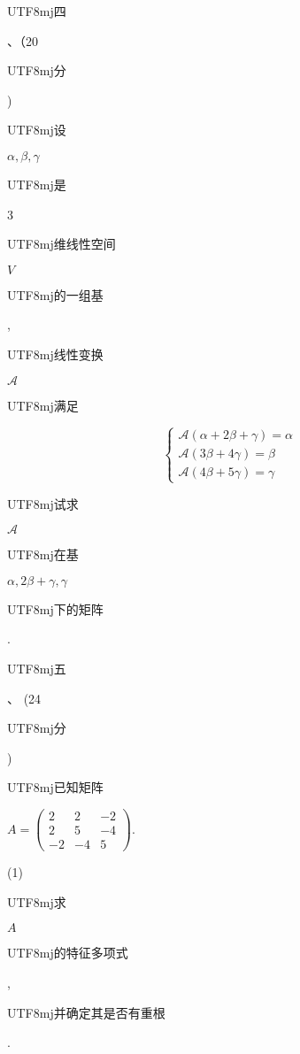 \documentclass[10pt]{article}
\begin{document}
\begin{CJK}{UTF8}{mj}四\end{CJK}、（20 \begin{CJK}{UTF8}{mj}分\end{CJK}) \begin{CJK}{UTF8}{mj}设\end{CJK} $\alpha, \beta, \gamma$ \begin{CJK}{UTF8}{mj}是\end{CJK} 3 \begin{CJK}{UTF8}{mj}维线性空间\end{CJK} $V$ \begin{CJK}{UTF8}{mj}的一组基\end{CJK}, \begin{CJK}{UTF8}{mj}线性变换\end{CJK} $\mathcal{A}$ \begin{CJK}{UTF8}{mj}满足\end{CJK}
$$
\left\{\begin{array}{l}
\mathcal{A}(\alpha+2 \beta+\gamma)=\alpha \\
\mathcal{A}(3 \beta+4 \gamma)=\beta \\
\mathcal{A}(4 \beta+5 \gamma)=\gamma
\end{array}\right.
$$
\begin{CJK}{UTF8}{mj}试求\end{CJK} $\mathcal{A}$ \begin{CJK}{UTF8}{mj}在基\end{CJK} $\alpha, 2 \beta+\gamma, \gamma$ \begin{CJK}{UTF8}{mj}下的矩阵\end{CJK}.

\begin{CJK}{UTF8}{mj}五\end{CJK}、 (24 \begin{CJK}{UTF8}{mj}分\end{CJK}) \begin{CJK}{UTF8}{mj}已知矩阵\end{CJK} $A=\left(\begin{array}{ccc}2 & 2 & -2 \\ 2 & 5 & -4 \\ -2 & -4 & 5\end{array}\right)$.

(1) \begin{CJK}{UTF8}{mj}求\end{CJK} $A$ \begin{CJK}{UTF8}{mj}的特征多项式\end{CJK}, \begin{CJK}{UTF8}{mj}并确定其是否有重根\end{CJK}.
\end{document}
